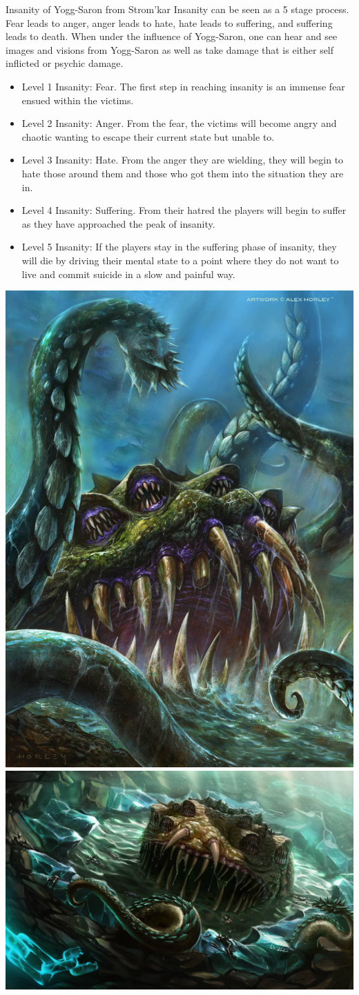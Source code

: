 \begin{commentbox}{Insanity of Yogg-Saron from Strom'kar}
	Insanity can be seen as a 5 stage process. Fear leads to anger, anger leads to hate, hate leads to suffering, and suffering leads to death. When under the influence of Yogg-Saron, one can hear and see images and visions from Yogg-Saron as well as take damage that is either self inflicted or psychic damage.
	\begin{itemize}
		\item Level 1 Insanity: Fear. The first step in reaching insanity is an immense fear ensued within the victims. 
		\item Level 2 Insanity: Anger. From the fear, the victims will become angry and chaotic wanting to escape their current state but unable to.
		\item Level 3 Insanity: Hate. From the anger they are wielding, they will begin to hate those around them and those who got them into the situation they are in.
		\item Level 4 Insanity: Suffering. From their hatred the players will begin to suffer as they have approached the peak of insanity.
		\item Level 5 Insanity: If the players stay in the suffering phase of insanity, they will die by driving their mental state to a point where they do not want to live and commit suicide in a slow and painful way.
	\end{itemize}

\begin{center}
	\includegraphics[width=0.4\linewidth]{img/WoW/CallofYogg-Saron.jpg} 	\includegraphics[width=0.59\linewidth]{img/WoW/yoggsarond210alw-fullview.jpg}
\end{center}
\end{commentbox}

